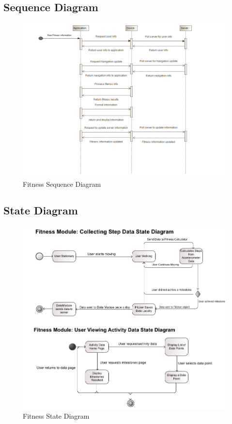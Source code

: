 \subsection{Sequence Diagram}
\begin{figure}[H]
	\centering
	\includegraphics[scale=0.70]{Fitness/fitness_sequence_diagram.png}
	\caption{Fitness Sequence Diagram}
	\label{fig:Fitness_Sequence_Diagram}
\end{figure}

\newpage

\subsection{State Diagram}
\begin{figure}[H]
	\centering
	\includegraphics[scale=0.54]{Fitness/fitness_state_diagram.png}
	\caption{Fitness State Diagram}
	\label{fig:fitness_state_diagram}
\end{figure}

